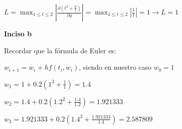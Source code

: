 \documentclass[11pt]{article}
\begin{document}
	$\displaystyle L=\max_{1\le t \le 2} \left|\frac{\partial (t^2+\frac{y}{t})}{\partial y}\right|=\max_{1\le t \le 2}\left|\frac{1}{t}\right|=1 \rightarrow \boxed{L=1}$
	
	\textbf{Inciso b}
	
	Recordar que la fórmula de Euler es:
	
	$w_{i+1}=w_i+hf(t_i,w_i)$, siendo en nuestro caso $w_0=1$
	
	$\displaystyle w_1=1+0.2\left(1^2+\frac{1}{1}\right)=1.4$
	
	$\displaystyle w_2=1.4+0.2\left(1.2^2+\frac{1.4}{1.2}\right)=1.921333$
	
	$\displaystyle \boxed{ w_3=1.921333+0.2\left(1.4^2+\frac{1.921333}{1.4}\right)=2.587809}$
	
\end{document}
